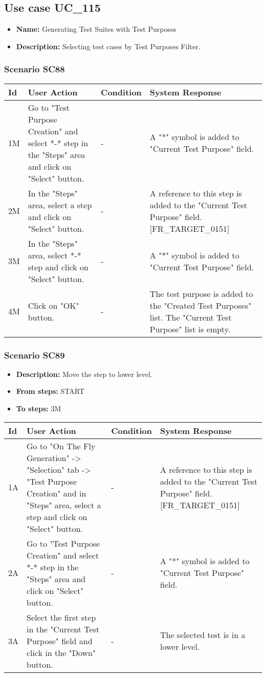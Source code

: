 \documentclass[a4paper,11pt]{article}
\newcommand{\bl}{\\ \hline}
\begin{document}
\subsection*{Use case UC_115}
\begin{itemize}
\item {\bf Name: }Generating Test Suites with Test Purposes
\item {\bf Description: }Selecting test cases by Test Purposes Filter.
			
\end{itemize}
\subsubsection*{Scenario SC88}
\begin{tabular}{|p{0.4in}|p{1.5in}|p{1.5in}|p{1.5in}|}
\hline
Id & User Action & Condition & System Response \bl 
1M & Go to "Test Purpose Creation" and select *-* step in the
						"Steps" area and click on "Select" button.    & - & A "*" symbol is added to "Current Test Purpose" field.
					\bl
2M & In the "Steps" area, select a step and click on "Select"
						button. & - & A reference to this step is added to the "Current Test
						Purpose" field. [FR_TARGET_0151]\bl
3M & In the "Steps" area, select *-* step and click on "Select"
						button.    & - & A "*" symbol is added to "Current Test Purpose" field.
					\bl
4M & Click on "OK" button. & - & The test purpose is added to the "Created Test Purposes"
						list. The "Current Test Purpose" list is empty.\bl
\end{tabular}
\subsubsection*{Scenario SC89}
\begin{itemize}
\item {\bf Description:} Move the step to lower level.
\item {\bf From steps:} START
\item {\bf To steps:} 3M
\end{itemize}
\begin{tabular}{|p{0.4in}|p{1.5in}|p{1.5in}|p{1.5in}|}
\hline
Id & User Action & Condition & System Response \bl 
1A & Go to "On The Fly Generation" -> "Selection" tab ->
						"Test Purpose Creation" and in "Steps" area, select a step and
						click on "Select" button. & - & A reference to this step is added to the "Current Test
						Purpose" field. [FR_TARGET_0151]\bl
2A & Go to "Test Purpose Creation" and select *-* step in the
						"Steps" area and click on "Select" button.    & - & A "*" symbol is added to "Current Test Purpose" field.
					\bl
3A & Select the first step in the "Current Test Purpose" field
						and click in the "Down" button. & - & The selected test is in a lower level. \bl
\end{tabular}
\end{document}
